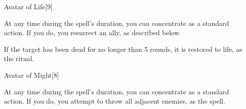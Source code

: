 \begin{spellsection}{Avatar of Life}[9]
    \begin{spellheader}
    \end{spellheader}
    \begin{spellcontent}
        \begin{spelltargetinginfo}
        \end{spelltargetinginfo}
        \begin{spelleffects}
            \spelleffect At any time during the spell's duration, you can concentrate as a standard action. If you do, you resurrect an ally, as described below.
            \spelldur \durlong
        \end{spelleffects}
    \end{spellcontent}
    \begin{spellsubcontent}
        \begin{spelltargetinginfo}
        \end{spelltargetinginfo}
        \begin{spelleffects}
            \spelleffect If the target has been dead for no longer than 5 rounds, it is restored to life, as the  ritual.
            \spelldur \durlong
        \end{spelleffects}
    \end{spellsubcontent}
    \begin{spellfooter}
        \miscastexplode
    \end{spellfooter}
\end{spellsection}

\begin{spellsection}{Avatar of Might}[8]
    \begin{spellheader}
    \end{spellheader}
    \begin{spellcontent}
        \begin{spelltargetinginfo}
        \end{spelltargetinginfo}
        \begin{spelleffects}
            \spelleffect At any time during the spell's duration, you can concentrate as a standard action. If you do, you attempt to throw all adjacent enemies, as the  spell.
            \spelldur \durlong
        \end{spelleffects}
    \end{spellcontent}
    \begin{spellfooter}
        \miscastexplode
    \end{spellfooter}
\end{spellsection}

